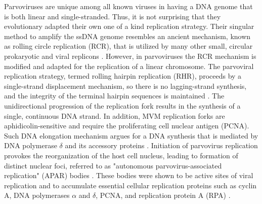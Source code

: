 Parvoviruses are unique among all known viruses in having a DNA genome that is both linear and single-stranded. Thus, it is not surprising that they evolutionary adapted their own one of a kind replication strategy. Their singular method to amplify the ssDNA genome resembles an ancient mechanism, known as rolling circle replication (RCR), that is utilized by many other small, circular prokaryotic and viral replicons \cite{pmid1630899, pmid8374079, pmid8824773, pmid9092519, pmid9010307}. However, in parvoviruses the RCR mechanism is modified and adapted for the replication of a linear chromosome. The parvoviral replication strategy, termed rolling hairpin replication (RHR), proceeds by a single-strand displacement mechanism, so there is no lagging-strand synthesis, and the integrity of the terminal hairpin sequences is maintained \cite{pmid967244}. The unidirectional progression of the replication fork results in the synthesis of a single, continuous DNA strand. In addition, MVM replication forks are aphidicolin-sensitive and require the proliferating cell nuclear antigen (PCNA). Such DNA elongation mechanism argues for a DNA synthesis that is mediated by DNA polymerase $\delta$ and its accessory proteins \cite{pmid10792046, pmid12050365}. Initiation of parvovirus replication provokes the reorganization of the host cell nucleus, leading to formation of distinct nuclear foci, referred to as "autonomous parvovirus-associated replication" (APAR) bodies \cite{pmid11287588, pmid10775619, pmid11907229}. These bodies were shown to be active sites of viral replication and to accumulate essential cellular replication proteins such as cyclin A, DNA polymerases $\alpha$ and $\delta$, PCNA, and replication protein A (RPA) \cite{pmid10792046}. 

